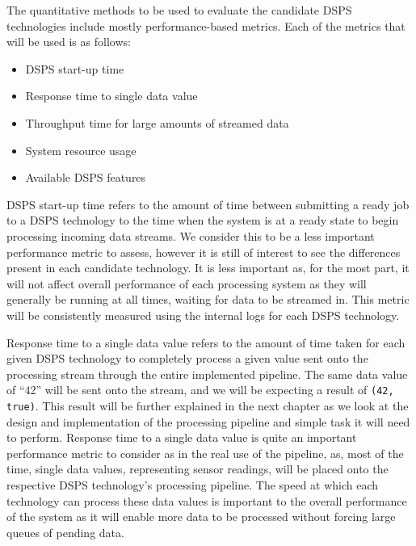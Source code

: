 The quantitative methods to be used to evaluate the candidate DSPS technologies include mostly performance-based
metrics. Each of the metrics that will be used is as follows:

\begin{itemize}
  \item DSPS start-up time
  \item Response time to single data value
  \item Throughput time for large amounts of streamed data
  \item System resource usage
  \item Available DSPS features
\end{itemize}

DSPS start-up time refers to the amount of time between submitting a ready job to a DSPS technology to the time when
the system is at a ready state to begin processing incoming data streams. We consider this to be a less important performance
metric to assess, however it is still of interest to see the differences present in each candidate technology. It is less
important as, for the most part, it will not affect overall performance of each processing system as they will generally
be running at all times, waiting for data to be streamed in. This metric will be consistently measured using the internal
logs for each DSPS technology.

Response time to a single data value refers to the amount of time taken for each given DSPS technology to completely
process a given value sent onto the processing stream through the entire implemented pipeline. The same data value of
``42'' will be sent onto the stream, and we will be expecting a result of \texttt{(42, true)}. This result will be
further explained in the next chapter as we look at the design and implementation of the processing pipeline and simple
task it will need to perform. Response time to a single data value is quite an important performance metric to consider
as in the real use of the pipeline, as, most of the time, single data values, representing sensor readings, will be placed
onto the respective DSPS technology's processing pipeline. The speed at which each technology can process these data
values is important to the overall performance of the system as it will enable more data to be processed without forcing
large queues of pending data.

